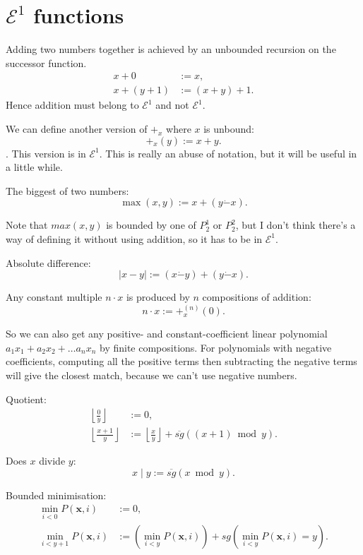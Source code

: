 \documentclass[a4paper]{article}
\newcommand{\grz}[1]{$\mathcal{E}^{#1}$}	%
\newcommand{\xvec}{\mathbf{x}}	%
\newcommand{\psub}{\dot -}	%
\newcommand{\rsg}{\overline{sg}} %
\newcommand{\recur}[1]{\begin{equation} \begin{split} #1 \end{split} \end{equation}}	%
\theoremstyle{plain}
\theoremstyle{definition}
\begin{document}
\section{\grz{1} functions}
Adding two numbers together is achieved by an unbounded recursion on the successor function.
\recur{
	x + 0 &:= x,			\\
	x + (y+1) &:= (x+y) + 1.
}
Hence addition must belong to \grz{1} and not \grz{1}.

We can define another version of $+_x$ where $x$ is unbound:
\begin{equation} +_x(y) := x + y. \end{equation}.
This version is in \grz{1}. This is really an abuse of notation, but it will be useful in a little while.

The biggest of two numbers:
\begin{equation} \max(x,y) := x + (y \psub x). \end{equation}

Note that $max(x,y)$ is bounded by one of $P_2^1$ or $P_2^2$, but I don't think there's a way of defining it without using addition, so it has to be in \grz{1}.

Absolute difference:
\begin{equation} |x - y| := (x \psub y) + (y \psub x). \end{equation}

Any constant multiple $n \cdot x$ is produced by $n$ compositions of addition:
\begin{equation} n \cdot x := +_x^{(n)}(0). \end{equation}

So we can also get any positive- and constant-coefficient linear polynomial $a_1x_1 + a_2x_2 + \dots a_nx_n$ by finite compositions. For polynomials with negative coefficients, computing all the positive terms then subtracting the negative terms will give the closest match, because we can't use negative numbers.

Quotient:
\recur{
	\left \lfloor \frac{0}{y} \right \rfloor &:= 0, \\
	\left \lfloor \frac{x+1}{y} \right \rfloor &:= \left \lfloor \frac{x}{y} \right \rfloor + \rsg\left( (x+1) \bmod{y} \right).
}

Does $x$ divide $y$:
\begin{equation} x \mid y := \rsg( x \bmod{y} ). \end{equation}

Bounded minimisation:
\recur{
	\min_{i < 0} P(\xvec,i) &:= 0,	\\
	\min_{i < y+1} P(\xvec,i) &:= \left( \min_{i  < y} P(\xvec,i) \right) + sg\left(\min_{i < y} P(\xvec,i) = y\right).
}
\end{document}
